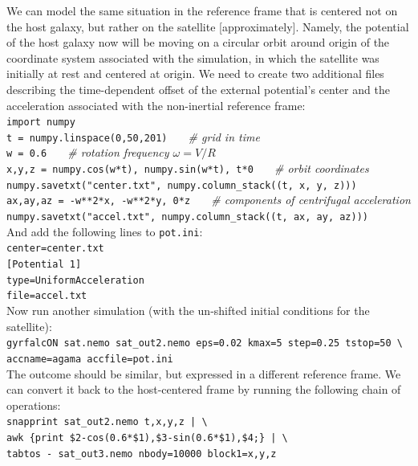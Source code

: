 \documentclass[12pt]{article}
\begin{document}
We can model the same situation in the reference frame that is centered not on the host galaxy, but rather on the satellite [approximately]. Namely, the potential of the host galaxy now will be moving on a circular orbit around origin of the coordinate system associated with the simulation, in which the satellite was initially at rest and centered at origin. We need to create two additional files describing the time-dependent offset of the external potential's center and the acceleration associated with the non-inertial reference frame:\\[2mm]
\texttt{import numpy\\t = numpy.linspace(0,50,201)}\textit{\color{Sepia} \ \ \ \# grid in time}\\
\texttt{w = 0.6}\textit{\color{Sepia} \ \ \ \# rotation frequency $\omega=V/R$}\\
\texttt{x,y,z = numpy.cos(w*t), numpy.sin(w*t), t*0}\textit{\color{Sepia} \ \ \ \# orbit coordinates}\\
\texttt{numpy.savetxt("center.txt", numpy.column_stack((t, x, y, z)))\\
ax,ay,az = -w**2*x, -w**2*y, 0*z}\textit{\color{Sepia} \ \ \ \# components of centrifugal acceleration}\\
\texttt{numpy.savetxt("accel.txt", numpy.column_stack((t, ax, ay, az)))}\\[2mm]
And add the following lines to \texttt{pot.ini}:\\[2mm]
\texttt{center=center.txt}\\
\texttt{[Potential 1]\\
type=UniformAcceleration\\
file=accel.txt}\\[2mm]
Now run another simulation (with the un-shifted initial conditions for the satellite):\\[2mm]
\texttt{gyrfalcON sat.nemo sat_out2.nemo eps=0.02 kmax=5 step=0.25 tstop=50 \textbackslash \\
\makebox[7mm]{} accname=agama accfile=pot.ini}\\[2mm]
The outcome should be similar, but expressed in a different reference frame. We can convert it back to the host-centered frame by running the following chain of operations:\\[2mm]
\texttt{snapprint sat_out2.nemo t,x,y,z | \textbackslash \\
awk  \{print \$2-cos(0.6*\$1),\$3-sin(0.6*\$1),\$4;\}\ | \textbackslash \\
tabtos - sat_out3.nemo nbody=10000 block1=x,y,z}
\vspace{2mm}
\end{document}
